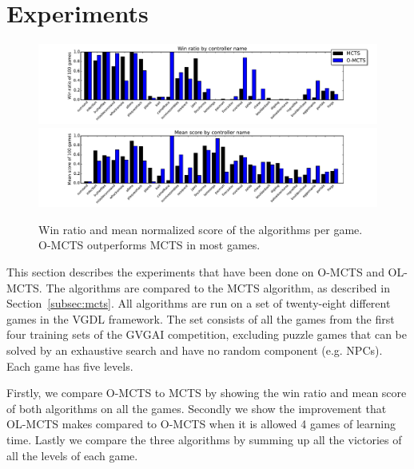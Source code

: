 \section{Experiments}
\label{sec:experiments}
\begin{figure}
\centering
\includegraphics[width=\textwidth]{includes/wins}
\centering
\includegraphics[width=\textwidth]{includes/scores}
\vspace{-.8cm}
\caption{Win ratio and mean normalized score of the algorithms per game. O-MCTS
outperforms MCTS in most games.}
\label{fig:scores}
\end{figure}

This section describes the experiments that have been done on
O-MCTS and OL-MCTS\@. The algorithms are compared to the MCTS
algorithm, as described in Section~\ref{subsec:mcts}. All algorithms are run on a set of
twenty-eight different games in the VGDL framework. The set consists of all the
games from the first four training sets of the GVGAI competition, excluding
puzzle games that can be solved by an exhaustive search and have no random
component (e.g. NPCs). Each game has five levels.

Firstly, we compare O-MCTS to MCTS by showing the win ratio and mean score of
both algorithms on all the games. Secondly we show the improvement that OL-MCTS
makes compared to O-MCTS when it is allowed 4 games of learning time. 
Lastly we compare the three algorithms by summing up all the victories of all
the levels of each game.  

